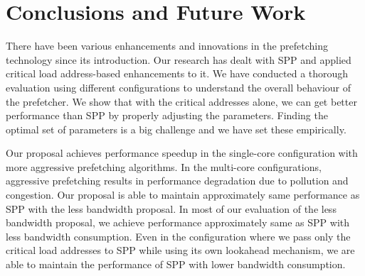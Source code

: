\chapter{Conclusions and Future Work}\label{Chapter6:Conclusion and Future Work}
There have been various enhancements and innovations in the prefetching technology since its introduction. Our research has dealt with SPP and applied critical load address-based enhancements to it. We have conducted a thorough evaluation using different configurations to understand the overall behaviour of the prefetcher. We show that with the critical addresses alone, we can get better performance than SPP by properly adjusting the parameters. Finding the optimal set of parameters is a big challenge and we have set these empirically.
 
Our proposal achieves performance speedup in the single-core configuration with more aggressive prefetching algorithms. In the multi-core configurations, aggressive prefetching results in performance degradation due to pollution and congestion. Our proposal is able to maintain approximately same performance as SPP with the less bandwidth proposal. In most of our evaluation of the less bandwidth proposal,  we achieve performance approximately same as SPP with less bandwidth consumption. Even in the configuration where we pass only the critical load addresses to SPP while using its own lookahead mechanism, we are able to maintain the performance of SPP with lower bandwidth consumption.
 
